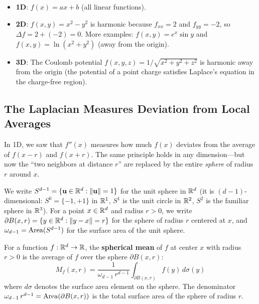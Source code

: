 \begin{notechapter}
\begin{example}
\label{harmonic-functions:ex:harmonic_examples}
\leavevmode
\begin{itemize}
    \item \textbf{1D}: $f(x) = ax + b$ (all linear functions).
    \item \textbf{2D}: $f(x,y) = x^2 - y^2$ is harmonic because
          $f_{xx} = 2$ and $f_{yy} = -2$, so $\Delta f = 2 + (-2) = 0$.
          More examples: $f(x,y) = e^x \sin y$ and
          $f(x,y) = \ln(x^2 + y^2)$ (away from the origin).
    \item \textbf{3D}: The Coulomb potential
          $f(x,y,z) = 1/\sqrt{x^2 + y^2 + z^2}$ is harmonic away from the
          origin (the potential of a point charge satisfies Laplace's
          equation in the charge-free region).
\end{itemize}
\end{example}

\subsection{The Laplacian Measures Deviation from Local Averages}

In 1D, we saw that $f''(x)$ measures how much $f(x)$ deviates from the
average of $f(x-r)$ and $f(x+r)$. The same principle holds in any
dimension---but now the ``two neighbors at distance $r$'' are replaced by
the entire \emph{sphere} of radius $r$ around $x$.

We write $S^{d-1} = \{\mathbf{u} \in \mathbb{R}^d : \|\mathbf{u}\| = 1\}$ for the
unit sphere in $\mathbb{R}^d$ (it is $(d{-}1)$-dimensional: $S^0 = \{-1,+1\}$ in
$\mathbb{R}^1$, $S^1$ is the unit circle in $\mathbb{R}^2$, $S^2$ is the familiar sphere in
$\mathbb{R}^3$). For a point $x \in \mathbb{R}^d$ and radius $r > 0$, we write
$\partial B(x,r) = \{y \in \mathbb{R}^d : \|y - x\| = r\}$ for the sphere of
radius $r$ centered at $x$, and $\omega_{d-1} = \operatorname{Area}(S^{d-1})$ for the
surface area of the unit sphere.

\begin{definition}
\label{harmonic-functions:def:spherical_mean}
For a function $f : \mathbb{R}^d \to \mathbb{R}$, the \textbf{spherical mean} of $f$ at
center $x$ with radius $r > 0$ is the average of $f$ over the sphere
$\partial B(x,r)$:
\begin{equation}
M_f(x, r) = \frac{1}{\omega_{d-1}\,r^{d-1}}
  \int_{\partial B(x,r)} f(y)\,d\sigma(y)
\end{equation}
where $d\sigma$ denotes the surface area element on the sphere. The
denominator $\omega_{d-1}\,r^{d-1} = \operatorname{Area}(\partial B(x,r))$ is the total
surface area of the sphere of radius $r$.
\end{definition}


\end{notechapter}
